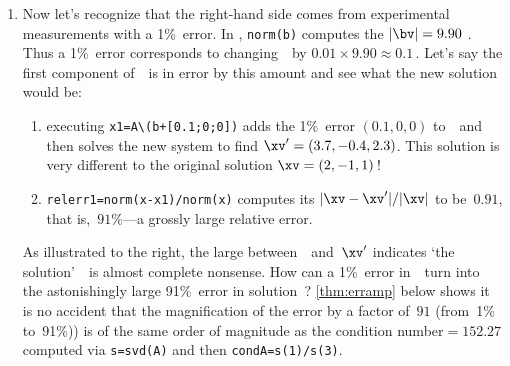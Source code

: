 \begin{example}
\begin{enumerate}
\item Now let's recognize that the right-hand side comes from experimental measurements with a 1\%~error.
In \script, \verb|norm(b)| computes the  \(|\bv|=9.90\) \twodp.
Thus a 1\%~error corresponds to changing~\bv\ by \(0.01\times 9.90\approx 0.1\)\,.
Let's say the first component of~\bv\ is in error by this amount and see what the new solution would be:
\setbox\ajrqrbox\hbox{}%
\marginajrbox%
\begin{enumerate}
\item executing \verb|x1=A\(b+[0.1;0;0])| adds the  1\%~error \((0.1,0,0)\) to~\bv\ and then solves the new system to find \(\xv'=(3.7,-0.4,2.3)\).
This solution is very different to the original solution \(\xv=(2,-1,1)\)\,!
\item {}\verb|relerr1=norm(x-x1)/norm(x)| computes its  \(|\xv-\xv'|/|\xv|\) to be~\(0.91\), that is,~\(91\%\)---a grossly large relative error.
\end{enumerate}

\begin{figbox}{}
As illustrated to the right, the large  between~\xv\ and~\(\xv'\) indicates `the solution'~\xv\ is almost complete nonsense.
How can a 1\%~error in~\bv\ turn into the astonishingly large 91\%~error in solution~\xv?  
\cref{thm:erramp} below shows it is no accident that the magnification of the error by a factor of~\(91\) (from~1\% to~91\%)) is of the same order of magnitude as the condition number\({}=152.27\) computed via \verb|s=svd(A)| and then \verb|condA=s(1)/s(3)|.
\end{figbox}



\end{enumerate}
\end{example}
